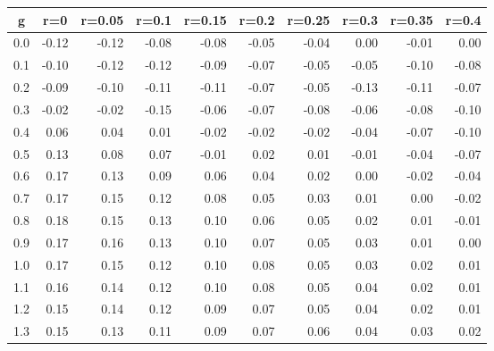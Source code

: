 %
\begin{table}[!tbp]
 \begin{center}
 \begin{tabular}{rrrrrrrrrr}\hline\hline
\multicolumn{1}{c}{g}&\multicolumn{1}{c}{r=0}&\multicolumn{1}{c}{r=0.05}&\multicolumn{1}{c}{r=0.1}&\multicolumn{1}{c}{r=0.15}&\multicolumn{1}{c}{r=0.2}&\multicolumn{1}{c}{r=0.25}&\multicolumn{1}{c}{r=0.3}&\multicolumn{1}{c}{r=0.35}&\multicolumn{1}{c}{r=0.4}\tabularnewline
\hline
0.0&-0.12&-0.12&-0.08&-0.08&-0.05&-0.04& 0.00&-0.01& 0.00\tabularnewline
0.1&-0.10&-0.12&-0.12&-0.09&-0.07&-0.05&-0.05&-0.10&-0.08\tabularnewline
0.2&-0.09&-0.10&-0.11&-0.11&-0.07&-0.05&-0.13&-0.11&-0.07\tabularnewline
0.3&-0.02&-0.02&-0.15&-0.06&-0.07&-0.08&-0.06&-0.08&-0.10\tabularnewline
0.4& 0.06& 0.04& 0.01&-0.02&-0.02&-0.02&-0.04&-0.07&-0.10\tabularnewline
0.5& 0.13& 0.08& 0.07&-0.01& 0.02& 0.01&-0.01&-0.04&-0.07\tabularnewline
0.6& 0.17& 0.13& 0.09& 0.06& 0.04& 0.02& 0.00&-0.02&-0.04\tabularnewline
0.7& 0.17& 0.15& 0.12& 0.08& 0.05& 0.03& 0.01& 0.00&-0.02\tabularnewline
0.8& 0.18& 0.15& 0.13& 0.10& 0.06& 0.05& 0.02& 0.01&-0.01\tabularnewline
0.9& 0.17& 0.16& 0.13& 0.10& 0.07& 0.05& 0.03& 0.01& 0.00\tabularnewline
1.0& 0.17& 0.15& 0.12& 0.10& 0.08& 0.05& 0.03& 0.02& 0.01\tabularnewline
1.1& 0.16& 0.14& 0.12& 0.10& 0.08& 0.05& 0.04& 0.02& 0.01\tabularnewline
1.2& 0.15& 0.14& 0.12& 0.09& 0.07& 0.05& 0.04& 0.02& 0.01\tabularnewline
1.3& 0.15& 0.13& 0.11& 0.09& 0.07& 0.06& 0.04& 0.03& 0.02\tabularnewline
\hline
\end{tabular}

\end{center}

\end{table}

